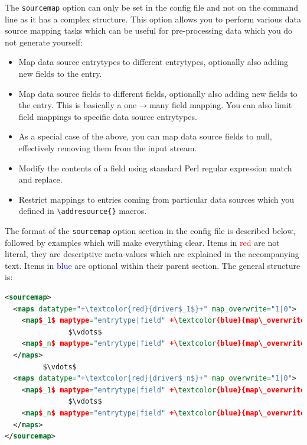 \documentclass{ltxdockit}
\begin{document}
The \verb+sourcemap+ option can only be set in the config file
and not on the command line as it has a complex structure. This
option allows you to perform various data source mapping
tasks which can be useful for pre-processing data which you do not
generate yourself:

\begin{itemize}
\item Map data source entrytypes to different entrytypes,
  optionally also adding new fields to the entry.
\item Map data source fields to different fields,
  optionally also adding new fields to the entry. This is basically a
  one$\rightarrow$many field mapping. You can also limit field
  mappings to specific data source entrytypes.
\item As a special case of the above, you can map data source fields
  to null, effectively removing them from the input stream.
\item Modify the contents of a field using standard Perl regular expression
  match and replace.
\item Restrict mappings to entries coming from particular data sources
  which you defined in \verb+\addresource{}+ macros.
\end{itemize}

\noindent The format of the \verb+sourcemap+ option section in the
config file is described below, followed by examples which will make
everything clear. Items in \textcolor{red}{red} are not
literal, they are descriptive meta-values which are explained in the
accompanying text. Items in \textcolor{blue}{blue} are optional within
their parent section. The general structure is:

\lstset{showspaces=false}
\begin{lstlisting}[language=xml,escapechar=+,mathescape=true]
<sourcemap>
  <maps datatype="+\textcolor{red}{driver$_1$}+" map_overwrite="1|0">
    <map$_1$ maptype="entrytype|field" +\textcolor{blue}{map\_overwrite="1|0"}+> ... </map$_1$>
               $\vdots$
    <map$_n$ maptype="entrytype|field" +\textcolor{blue}{map\_overwrite="1|0"}+> ... </map$_n$>
  </maps>
         $\vdots$
  <maps datatype="+\textcolor{red}{driver$_n$}+" map_overwrite="1|0">
    <map$_1$ maptype="entrytype|field" +\textcolor{blue}{map\_overwrite="1|0"}+> ... </map$_1$>
               $\vdots$
    <map$_n$ maptype="entrytype|field" +\textcolor{blue}{map\_overwrite="1|0"}+> ... </map$_n$>
  </maps>
</sourcemap>
\end{lstlisting}
\end{document}
